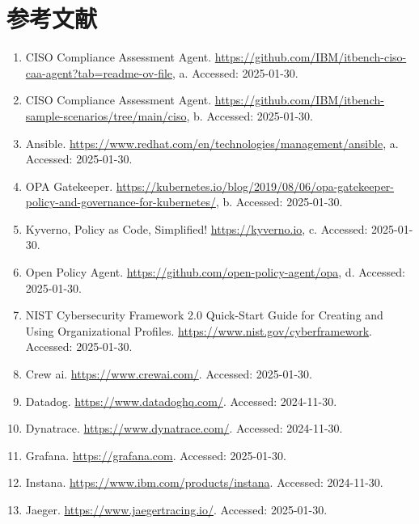 \section*{参考文献}

\begin{enumerate}[leftmargin=2em,itemsep=2pt]

\item CISO Compliance Assessment Agent. \url{https://github.com/IBM/itbench-ciso-caa-agent?tab=readme-ov-file}, a. Accessed: 2025-01-30.

\item CISO Compliance Assessment Agent. \url{https://github.com/IBM/itbench-sample-scenarios/tree/main/ciso}, b. Accessed: 2025-01-30.

\item Ansible. \url{https://www.redhat.com/en/technologies/management/ansible}, a. Accessed: 2025-01-30.

\item OPA Gatekeeper. \url{https://kubernetes.io/blog/2019/08/06/opa-gatekeeper-policy-and-governance-for-kubernetes/}, b. Accessed: 2025-01-30.

\item Kyverno, Policy as Code, Simplified! \url{https://kyverno.io}, c. Accessed: 2025-01-30.

\item Open Policy Agent. \url{https://github.com/open-policy-agent/opa}, d. Accessed: 2025-01-30.

\item NIST Cybersecurity Framework 2.0 Quick-Start Guide for Creating and Using Organizational Profiles. \url{https://www.nist.gov/cyberframework}. Accessed: 2025-01-30.

\item Crew ai. \url{https://www.crewai.com/}. Accessed: 2025-01-30.

\item Datadog. \url{https://www.datadoghq.com/}. Accessed: 2024-11-30.

\item Dynatrace. \url{https://www.dynatrace.com/}. Accessed: 2024-11-30.

\item Grafana. \url{https://grafana.com}. Accessed: 2025-01-30.

\item Instana. \url{https://www.ibm.com/products/instana}. Accessed: 2024-11-30.

\item Jaeger. \url{https://www.jaegertracing.io/}. Accessed: 2025-01-30.


\end{enumerate}
